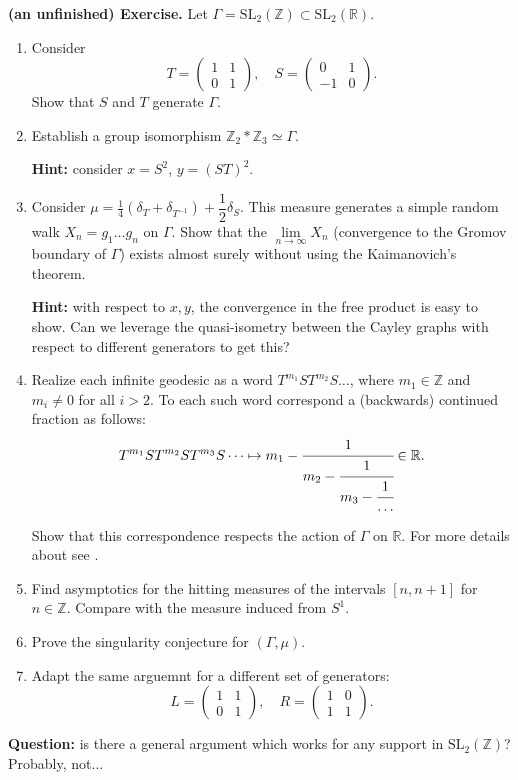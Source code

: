 \documentclass[11pt]{amsart}
\theoremstyle{definition}
\begin{document}
	\textbf{(an unfinished) Exercise.} Let $\Gamma = \text{SL}_2(\mathbb{Z}) \subset \text{SL}_2(\mathbb{R})$. 
	\begin{enumerate}
		\item Consider 
		\[
		T = \begin{pmatrix} 1 & 1 \\ 0 & 1 \end{pmatrix}, \quad S = \begin{pmatrix} 0 & 1 \\ -1 & 0 \end{pmatrix}.
		\]
		Show that $S$ and $T$ generate $\Gamma$.
		\item Establish a group isomorphism $\mathbb{Z}_2 * \mathbb{Z}_3 \simeq \Gamma$.
		
		\textbf{Hint:} consider $x = S^2$, $y = (ST)^2$. 
		\item Consider $\mu = \frac{1}{4} (\delta_T + \delta_{T^{-1}}) + \dfrac{1}{2} \delta_S$. This measure generates a simple random walk $X_n = g_1 \dots g_n$ on $\Gamma$. Show that the $\lim\limits_{n \rightarrow \infty} X_n$ (convergence to the Gromov boundary of $\Gamma$) exists almost surely without using the Kaimanovich's theorem.
		
		\textbf{Hint:} with respect to $x, y$, the convergence in the free product is easy to show. Can we leverage the quasi-isometry between the Cayley graphs with respect to different generators to get this? 
		\item Realize each infinite geodesic as a word $T^{m_1} S T^{m_2} S \dots$, where $m_1 \in \mathbb{Z}$ and $m_i \ne 0$ for all $i > 2$. To each such word correspond a (backwards) continued fraction as follows:
		\[
		T^{m_1} S T^{m_2} S T^{m_3} S \dots \mapsto m_1 - \cfrac{1}{m_2 - \cfrac{1}{m_3 - \cfrac{1}{\dots}}} \in \mathbb{R}.
		\]
		
		Show that this correspondence respects the action of $\Gamma$ on $\mathbb{R}$. For more details about see \cite{series}.
		
		\item Find asymptotics for the hitting measures of the intervals $[n, n+1]$ for $n \in \mathbb{Z}$. Compare with the measure induced from $S^1$.
		\item Prove the singularity conjecture for $(\Gamma, \mu)$.
		\item Adapt the same arguemnt for a different set of generators:
		\[
		L = \begin{pmatrix} 1 & 1 \\ 0 & 1 \end{pmatrix}, \quad R = \begin{pmatrix} 1 & 0 \\ 1 & 1 \end{pmatrix}.
		\]
	\end{enumerate}
	\textbf{Question:} is there a general argument which works for any support in $\text{SL}_2(\mathbb{Z})$? Probably, not...
	
\end{document}
